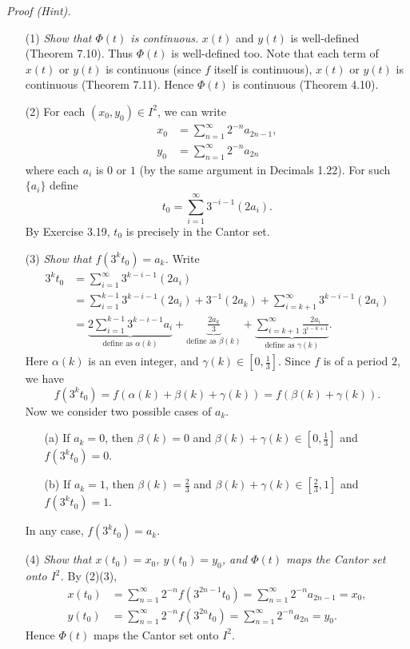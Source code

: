 \documentclass{article}
\begin{document}
\emph{Proof (Hint).}
\begin{enumerate}
\item[(1)]
  \emph{Show that $\Phi(t)$ is continuous.}
  $x(t)$ and $y(t)$ is well-defined (Theorem 7.10).
  Thus $\Phi(t)$ is well-defined too.
  Note that each term of $x(t)$ or $y(t)$ is continuous
  (since $f$ itself is continuous),
  $x(t)$ or $y(t)$ is continuous (Theorem 7.11).
  Hence $\Phi(t)$ is continuous (Theorem 4.10).

\item[(2)]
  For each $(x_0,y_0) \in I^2$, we can write
  \begin{align*}
    x_0 &= \sum_{n=1}^{\infty} 2^{-n} a_{2n-1}, \\
    y_0 &= \sum_{n=1}^{\infty} 2^{-n} a_{2n}
  \end{align*}
  where each $a_i$ is $0$ or $1$
  (by the same argument in Decimals 1.22).
  For such $\{a_i\}$ define
  \[
    t_0
    = \sum_{i=1}^{\infty} 3^{-i-1}(2a_i).
  \]
  By Exercise 3.19, $t_0$ is precisely in the Cantor set.

\item[(3)]
  \emph{Show that $f(3^k t_0) = a_k$.}
  Write
  \begin{align*}
    3^k t_0
    &= \sum_{i=1}^{\infty} 3^{k-i-1}(2a_i) \\
    &= \sum_{i=1}^{k-1} 3^{k-i-1}(2a_i)
      + 3^{-1}(2a_k)
      + \sum_{i=k+1}^{\infty} 3^{k-i-1}(2a_i) \\
    &= \underbrace{2 \sum_{i=1}^{k-1} 3^{k-i-1} a_i}_{\text{define as } \alpha(k)}
      + \underbrace{\frac{2a_k}{3}}_{\text{define as } \beta(k)}
      + \underbrace{\sum_{i=k+1}^{\infty} \frac{2a_i}{3^{i-k+1}}}_{\text{define as } \gamma(k)}.
  \end{align*}
  Here $\alpha(k)$ is an even integer, and $\gamma(k) \in \left[0,\frac{1}{3}\right]$.
  Since $f$ is of a period $2$, we have
  \[
    f(3^k t_0)
    = f(\alpha(k) + \beta(k) + \gamma(k))
    = f(\beta(k) + \gamma(k)).
  \]
  Now we consider two possible cases of $a_k$.
  \begin{enumerate}
    \item[(a)]
      If $a_k = 0$, then $\beta(k) = 0$ and
      $\beta(k) + \gamma(k) \in \left[0,\frac{1}{3}\right]$ and
      $f(3^k t_0) = 0$.
    \item[(b)]
      If $a_k = 1$, then $\beta(k) = \frac{2}{3}$ and
      $\beta(k) + \gamma(k) \in \left[\frac{2}{3}, 1\right]$ and
      $f(3^k t_0) = 1$.
  \end{enumerate}
  In any case, $f(3^k t_0) = a_k$.

\item[(4)]
  \emph{Show that $x(t_0) = x_0$, $y(t_0) = y_0$,
  and $\Phi(t)$ maps the Cantor set onto $I^2$.}
  By (2)(3),
  \begin{align*}
    x(t_0)
    &= \sum_{n=1}^{\infty} 2^{-n} f(3^{2n-1}t_0)
    = \sum_{n=1}^{\infty} 2^{-n} a_{2n-1}
    = x_0, \\
    y(t_0)
    &= \sum_{n=1}^{\infty} 2^{-n} f(3^{2n}t_0)
    = \sum_{n=1}^{\infty} 2^{-n} a_{2n}
    = y_0.
  \end{align*}
  Hence $\Phi(t)$ maps the Cantor set onto $I^2$.
\end{enumerate}
\end{document}
